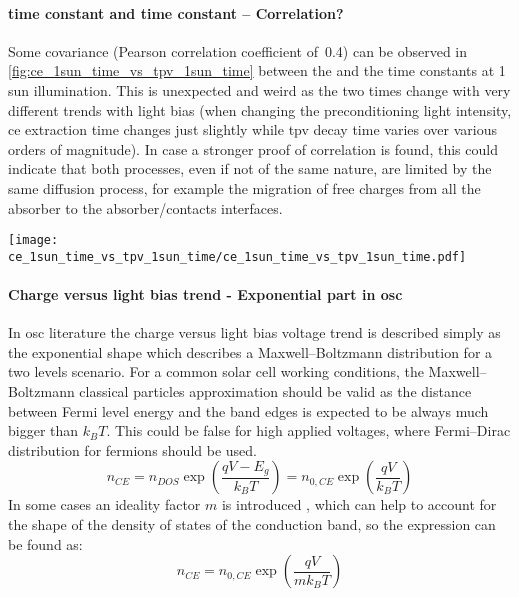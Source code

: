 \paragraph{ time constant and  time constant -- Correlation?}
Some covariance (Pearson correlation coefficient of~0.4) can be observed in \cref{fig:ce_1sun_time_vs_tpv_1sun_time} between the  and the  time constants at 1 sun illumination.
This is unexpected and weird as the two times change with very different trends with light bias (when changing the preconditioning light intensity, \gls{ce} extraction time changes just slightly while \gls{tpv} decay time varies over various orders of magnitude).
In case a stronger proof of correlation is found, this could indicate that both processes, even if not of the same nature, are limited by the same diffusion process, for example the migration of free charges from all the absorber to the absorber/contacts interfaces.

\begin{SCfigure}%
	\centering
	\texttt{[image: ce\_1sun\_time\_vs\_tpv\_1sun\_time/ce\_1sun\_time\_vs\_tpv\_1sun\_time.pdf]}
	\label{fig:ce_1sun_time_vs_tpv_1sun_time}
\end{SCfigure}

\paragraph{Charge versus light bias trend - Exponential part in \gls{osc}}
In \gls{osc} literature the charge versus light bias voltage trend is described simply as the exponential shape which describes a Maxwell--Boltzmann distribution for a two levels scenario.
For a common solar cell working conditions, the Maxwell--Boltzmann classical particles approximation should be valid as the distance between Fermi level energy and the band edges is expected to be always much bigger than $k_BT$.
This could be false for high applied voltages, where Fermi--Dirac distribution for fermions should be used.
$$n_{CE} = n_{DOS} \exp\left(\frac{qV - E_g}{k_BT}\right) = n_{0,CE} \exp\left(\frac{qV}{k_BT}\right)$$
In some cases an ideality factor $m$ is introduced \cite{Kirchartz2012}, which can help to account for the shape of the density of states of the conduction band, so the expression can be found as:
$$n_{CE} = n_{0,CE} \exp\left(\frac{qV}{mk_BT}\right)$$

